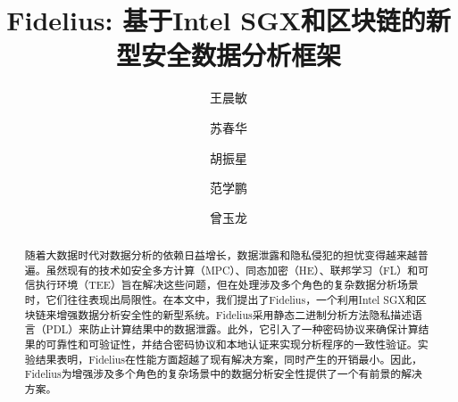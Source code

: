 \documentclass[sigconf]{acmart}
\begin{document}
\title{Fidelius: 基于Intel SGX和区块链的新型安全数据分析框架}


\author{王晨敏}

\author{苏春华}

\author{胡振星}

\author{范学鹏}

\author{曾玉龙}


\begin{abstract}
随着大数据时代对数据分析的依赖日益增长，数据泄露和隐私侵犯的担忧变得越来越普遍。虽然现有的技术如安全多方计算（MPC）、同态加密（HE）、联邦学习（FL）和可信执行环境（TEE）旨在解决这些问题，但在处理涉及多个角色的复杂数据分析场景时，它们往往表现出局限性。在本文中，我们提出了Fidelius，一个利用Intel SGX和区块链来增强数据分析安全性的新型系统。Fidelius采用静态二进制分析方法隐私描述语言（PDL）来防止计算结果中的数据泄露。此外，它引入了一种密码协议来确保计算结果的可靠性和可验证性，并结合密码协议和本地认证来实现分析程序的一致性验证。实验结果表明，Fidelius在性能方面超越了现有解决方案，同时产生的开销最小。因此，Fidelius为增强涉及多个角色的复杂场景中的数据分析安全性提供了一个有前景的解决方案。
\end{abstract}
\end{document}
